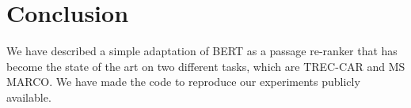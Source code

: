 \documentclass{article} \usepackage{iclr2019_conference}
\begin{document}
\section{Conclusion}

We have described a simple adaptation of BERT as a passage re-ranker that has become the state of the art on two different tasks, which are TREC-CAR and MS MARCO. We have made the code to reproduce our experiments publicly available.



\end{document}
